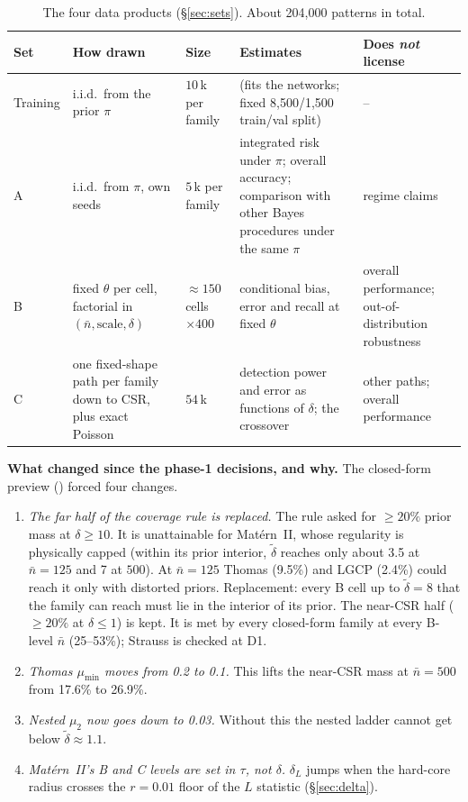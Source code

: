 \documentclass[10pt,a4paper]{article}
\newcommand{\code}[1]{\texttt{\detokenize{#1}}}
\newcommand{\nbar}{\bar n}
\newcommand{\dtil}{\tilde\delta}
\newenvironment{keybox}{\par\smallskip\noindent\begin{lrbox}{\keyboxsave}\begin{minipage}{\dimexpr\linewidth-2\fboxsep-2\fboxrule\relax}\small\setlength{\parskip}{0.4em}}{\end{minipage}\end{lrbox}\fbox{\usebox{\keyboxsave}}\par\smallskip}
\begin{document}
\begin{table}[ht]
\centering\small
\begin{tabularx}{\linewidth}{@{}l l l L L@{}}
\toprule
Set & How drawn & Size & Estimates & Does \emph{not} license\\
\midrule
Training & i.i.d.\ from the prior $\pi$ & $10\,$k per family & (fits the networks; fixed 8{,}500/1{,}500 train/val split) & --\\
A & i.i.d.\ from $\pi$, own seeds & $5\,$k per family & integrated risk under $\pi$; overall accuracy; comparison with other Bayes procedures under the same $\pi$ & regime claims\\
B & fixed $\theta$ per cell, factorial in $(\nbar,\text{scale},\delta)$ & $\approx150$ cells $\times400$ & conditional bias, error and recall at fixed $\theta$ & overall performance; out-of-distribution robustness\\
C & one fixed-shape path per family down to CSR, plus exact Poisson & $54\,$k & detection power and error as functions of $\delta$; the crossover & other paths; overall performance\\
\bottomrule
\end{tabularx}
\caption{The four data products (\S\ref{sec:sets}). About 204{,}000 patterns in total.}
\label{tab:products}
\end{table}

\begin{keybox}
\textbf{What changed since the phase-1 decisions, and why.} The closed-form preview (\code{design_preview.py}) forced four changes.
\begin{enumerate}
\item \emph{The far half of the coverage rule is replaced.} The rule asked for $\ge20\%$ prior mass at $\delta\ge10$. It is unattainable for Mat\'ern~II, whose regularity is physically capped (within its prior interior, $\dtil$ reaches only about 3.5 at $\nbar=125$ and 7 at $500$). At $\nbar=125$ Thomas (9.5\%) and LGCP (2.4\%) could reach it only with distorted priors. Replacement: every B cell up to $\dtil=8$ that the family can reach must lie in the interior of its prior. The near-CSR half ($\ge20\%$ at $\delta\le1$) is kept. It is met by every closed-form family at every B-level $\nbar$ (25--53\%); Strauss is checked at D1.
\item \emph{Thomas $\mu_{\min}$ moves from 0.2 to 0.1.} This lifts the near-CSR mass at $\nbar=500$ from 17.6\% to 26.9\%.
\item \emph{Nested $\mu_2$ now goes down to 0.03.} Without this the nested ladder cannot get below $\dtil\approx1.1$.
\item \emph{Mat\'ern~II's B and C levels are set in $\tau$, not $\delta$.} $\delta_L$ jumps when the hard-core radius crosses the $r=0.01$ floor of the $L$ statistic (\S\ref{sec:delta}).
\end{enumerate}
\end{keybox}
\end{document}
